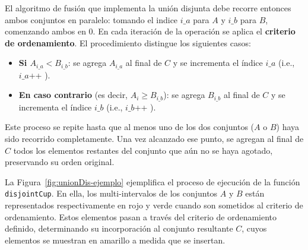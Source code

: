 El algoritmo de fusión que implementa la unión disjunta debe recorre entonces ambos conjuntos en paralelo: tomando el indice $i\_a$ para $A$ y $i\_b$ para $B$, comenzando ambos en 0. En cada iteración de la operación se aplica el \textbf{criterio de ordenamiento}. El procedimiento distingue los siguientes casos:

\begin{itemize}
    \item \textbf{Si $A_{i\_a} < B_{i\_b}$}: se agrega $A_{i\_a}$ al final de $C$ y se incrementa el índice ${i\_a}$ (i.e., $i\_a$\!+\!+ ).
    \item \textbf{En caso contrario} (es decir, $A_i \geq B_{i\_b}$): se agrega $B_{i\_b}$ al final de $C$ y se incrementa el índice $i\_b$ (i.e., $i\_b$\!+\!+ ).
\end{itemize}

Este proceso se repite hasta que al menos uno de los dos conjuntos ($A$ o $B$) haya sido recorrido completamente. Una vez alcanzado ese punto, se agregan al final de $C$ todos los elementos restantes del conjunto que aún no se haya agotado, preservando su orden original.

La Figura~\ref{fig:unionDis-ejemplo} ejemplifica el proceso de ejecución de la función \texttt{disjointCup}. En ella, los multi-intervalos de los conjuntos $A$ y $B$ están representados respectivamente en rojo y verde cuando son sometidos al criterio de ordenamiento. Estos elementos pasan a través del criterio de ordenamiento definido, determinando su incorporación al conjunto resultante $C$, cuyos elementos se muestran en amarillo a medida que se insertan.


